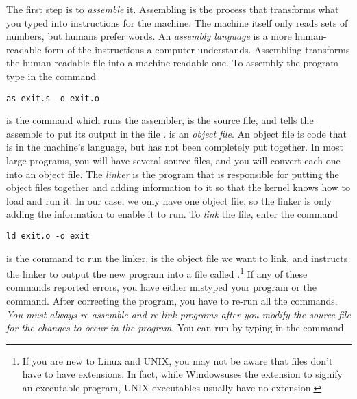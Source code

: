 The first step is to \emph{assemble} it.  Assembling is the
process that transforms what you typed into instructions for the machine.  
The machine itself only reads sets of numbers, but humans prefer words.
An \emph{assembly language} is a more human-readable
form of the instructions a computer understands.  Assembling transforms
the human-readable file into a machine-readable one.
To assembly the program type in the command

\begin{simpletyping}
\begin{lstlisting}
as exit.s -o exit.o
\end{lstlisting}
\end{simpletyping}

 is the command which runs the assembler,  
 is the source file, and 
 tells the assemble to put its output
in the file .
 is an \emph{object file}.  An
object file is code that is in the machine's language, but has not
been completely put together.  In most large programs, you will have
several source files, and you will convert
each one into an object file.  The \emph{linker} is the program that is
responsible for putting the object files together and adding 
information to it so that the kernel knows how to load and run it.
In our case, we only have one object file, so the linker is only adding
the information to enable it to run.  To \emph{link} the
file, enter the command

\begin{simpletyping}
\begin{lstlisting}
ld exit.o -o exit
\end{lstlisting}
\end{simpletyping}

 is the command to run the linker, 
 is the object file we want to link,
and  instructs the linker to output
the new program into a file called .\footnote{If you are new to Linux and UNIX\textregistered, you may not be aware that files don't
have to have extensions.  In fact, while Windows\textregistered uses the 
 extension to signify an executable program,
UNIX executables usually have no extension.}  If any
of these commands reported errors, you have either mistyped your program
or the command.  After
correcting the program, you have to re-run all the commands.
\emph{You must always re-assemble and re-link
programs after you modify the source file for the changes to occur in the
program}. You can run  by typing in 
the command

